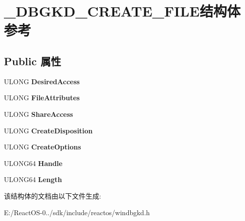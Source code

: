 \hypertarget{struct___d_b_g_k_d___c_r_e_a_t_e___f_i_l_e}{}\section{\+\_\+\+D\+B\+G\+K\+D\+\_\+\+C\+R\+E\+A\+T\+E\+\_\+\+F\+I\+L\+E结构体 参考}
\label{struct___d_b_g_k_d___c_r_e_a_t_e___f_i_l_e}
\subsection*{Public 属性}
\begin{DoxyCompactItemize}
\item 
\mbox{\label{struct___d_b_g_k_d___c_r_e_a_t_e___f_i_l_e_a32e9013657dbbdb4b0436c75d4a49637}} 
U\+L\+O\+NG {\bfseries Desired\+Access}
\item 
\mbox{\label{struct___d_b_g_k_d___c_r_e_a_t_e___f_i_l_e_ae42297d6bd5444ef4e19342e3cae8b5f}} 
U\+L\+O\+NG {\bfseries File\+Attributes}
\item 
\mbox{\label{struct___d_b_g_k_d___c_r_e_a_t_e___f_i_l_e_a96df307a49a5a0968899f99c6b5de5bd}} 
U\+L\+O\+NG {\bfseries Share\+Access}
\item 
\mbox{\label{struct___d_b_g_k_d___c_r_e_a_t_e___f_i_l_e_a8d9fbb73b607bd21d9014603053b6900}} 
U\+L\+O\+NG {\bfseries Create\+Disposition}
\item 
\mbox{\label{struct___d_b_g_k_d___c_r_e_a_t_e___f_i_l_e_a7d086aeabb6ded309cc5495a2ef7b4d8}} 
U\+L\+O\+NG {\bfseries Create\+Options}
\item 
\mbox{\label{struct___d_b_g_k_d___c_r_e_a_t_e___f_i_l_e_a25e050aa343ebc260b06f70bb77fe4d1}} 
U\+L\+O\+N\+G64 {\bfseries Handle}
\item 
\mbox{\label{struct___d_b_g_k_d___c_r_e_a_t_e___f_i_l_e_a80d1a93744bd6f454934b7038f2e838b}} 
U\+L\+O\+N\+G64 {\bfseries Length}
\end{DoxyCompactItemize}


该结构体的文档由以下文件生成\+:\begin{DoxyCompactItemize}
\item 
E\+:/\+React\+O\+S-\/0../sdk/include/reactos/windbgkd.\+h\end{DoxyCompactItemize}

